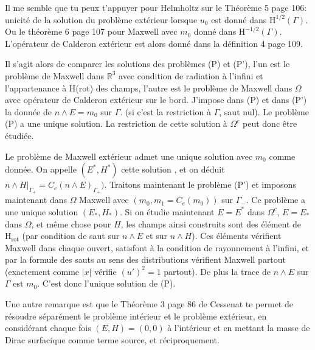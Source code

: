 \documentclass[12pt,%
    twoside,%
    a4paper,%
    openright, %
    ]{book}
\numberwithin{equation}{section} %
\newcommand{\RR}{\mathbb R}
\newcommand{\Sobup}[1][{}]{\mathrm{H}^\mathrm{#1}}
\newcommand{\Sobdw}[1][{}]{\mathrm{H}_\mathrm{#1}}
\newcommand{\Sobolev}[1][{}]{\Sobup[#1]}
\newcommand{\Hrot}{\Sobdw[rot]}
\newcounter{REM}
\newenvironment{REM}[1][\theREM]
    {%
        \stepcounter{REM}
        \hypertarget{REM#1}{}%
        \pdfbookmark[0]{REM \theREM}{REM#1}
        \begin{tcolorbox}[%
                title={Remarque \theREM},%
                colback=red!30!white,%
                colframe=red!75!black,%
            ]
    }
    {
        \end{tcolorbox}%
    }%
\begin{document}
    \begin{REM}
        
        Il me semble que tu peux t'appuyer pour Helmholtz sur le Théorème 5 page 106: unicité de la solution du problème extérieur lorsque \(u_0\) est donné dans \(\Sobolev[1/2](\Gamma)\).
        Ou le théorème 6 page 107 pour Maxwell avec \(m_0\) donné dans \(\Sobolev[-1/2](\Gamma)\).
        L'opérateur de Calderon extérieur est alors donné dans la définition 4 page 109.
        
        Il s'agit alors de comparer les solutions des problèmes (P) et (P'), l'un est le problème de Maxwell dans \(\RR^3\) avec condition de radiation à l'infini et l'appartenance à H(rot) des champs, l'autre est le problème de Maxwell dans \(\Omega\) avec opérateur de Calderon extérieur sur le bord.
        J'impose dans (P) et dans (P') la donnée de \(n\wedge E=m_0\) sur \(\Gamma\). (si c'est la restriction à \(\Gamma\), saut nul).
        Le problème (P)  a une unique solution.
        La restriction de cette solution à \(\Omega^c\) peut donc être étudiée.
        
        
        Le problème de Maxwell extérieur admet une unique solution avec \(m_0\) comme donnée. On appelle \((E^*, H^*)\) cette solution , et on déduit \(n\wedge H\vert_{\Gamma_+}= C_e(n\wedge E)_{\Gamma_+})\).
        Traitons maintenant le problème (P') et imposons maintenant dans \(\Omega\) Maxwell avec \((m_0, m_1=C_e(m_0))\) sur \(\Gamma_-\).
        Ce problème a une unique solution \((E_*, H_*)\).
        Si on étudie maintenant \(E=E^*\) dans \(\Omega^c\), \(E=E_*\) dans \(\Omega\), et même chose pour \(H\), les champs ainsi construits sont des élément de \(\Hrot\) (par condition de saut sur \(n\wedge E\) et sur \(n\wedge H\)).
        Ces éléments vérifient Maxwell dans chaque ouvert, satisfont à la condition de rayonnement à l'infini, et par la formule des sauts au sens des distributions vérifient Maxwell partout (exactement comme \(\vert x\vert\) vérifie \((u')^2=1\) partout).
        De plus la trace de \(n\wedge E\) sur \(\Gamma\) est \(m_0\). C'est donc l'unique solution de (P).
        
        
    \end{REM}
    \begin{REM}
    Une autre remarque est que le Théorème 3 page 86 de Cessenat te permet de résoudre séparément le problème intérieur et le problème extérieur, en considérant chaque fois \((E,H)=(0,0)\) à l'intérieur et en mettant la masse de Dirac surfacique comme terme source, et réciproquement.
    \end{REM}
\end{document}
